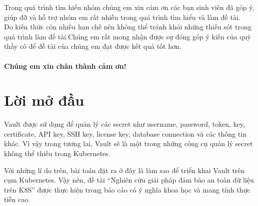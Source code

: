 \documentclass[12pt,a4paper]{report}
\begin{document}
	\hspace{1cm}Trong quá trình tìm hiểu nhóm chúng em xin cảm ơn các bạn sinh viên đã góp ý, giúp đỡ và hỗ trợ nhóm em rất nhiều trong quá trình tìm hiểu và làm đề tài.\\
	
	\hspace{1cm}Do kiến thức còn nhiều hạn chế nên không thể tránh khỏi những thiếu sót trong quá trình làm đề tài.Chúng em rất mong nhận được sự đóng góp ý kiến của quý thầy cô để đề tài của chúng em đạt được kết quả tốt hơn.\\
	\bigskip \\
	\textbf{Chúng em xin chân thành cảm ơn!}
	\chapter*{\centering Lời mở đầu}
	\hspace{1cm}{Trong những năm gần đây, Kubernetes đã trở thành một trong những công cụ quản lý container phổ biến nhất. Điều này là do sự phát triển mạnh mẽ của Kubernetes, cũng như sự phổ biến của container. Trong các doanh nghiệp hiện nay, Kubernetes là một phần không thể thiếu được sử dụng để quản lý các ứng dụng container, cung cấp các dịch vụ như load balancing, autoscaling, logging, monitoring, backup và restore, cũng như quản lý các tài nguyên của các ứng dụng như CPU, Memory, Storage, Network. Tuy nhiên, việc sử dụng Kubernetes cũng có những hạn chế, đặc biệt là trong việc quản lý các cấu hình nhạy cảm của ứng dụng và các tài nguyên của ứng dụng. Vì vậy, trong đề tài này, chúng ta sẽ tìm hiểu về Vault, một công cụ quản lý secret phổ biến nhất hiện nay, được phát triển bởi HashiCorp. \\}
	
	{\hspace{0.3cm}Vault được sử dụng để quản lý các secret như username, password, token, key, certificate, API key, SSH key, license key, database connection và các thông tin khác. Vì vậy trong tương lai, Vault sẽ là một trong những công cụ quản lý secret không thể thiếu trong Kubernetes.\\}
	
	\hspace{0.3cm}Với những lí do trên, bài toán đặt ra ở đây là làm sao để triển khai Vault trên cụm Kubernetes. Vậy nên, đề tài “Nghiên cứu giải pháp đảm bảo an toàn dữ liệu trên K8S” được thực hiện trong báo cáo có ý nghĩa khoa học và mang tính thực tiễn cao.\\
	
\end{document}
